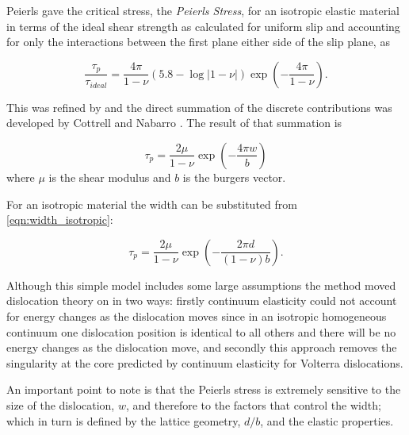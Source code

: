 Peierls gave the critical stress, the \emph{Peierls Stress}, for an isotropic elastic material in terms of the ideal shear strength as calculated for uniform slip and accounting for only the interactions between the first plane either side of the slip plane, as


\begin{equation}
\frac{\tau_p}{\tau_{ideal}} = \frac{4 \pi}{1 - \nu} (5.8 - \log|1-\nu|) \exp\left(-\frac{4\pi}{1 - \nu}\right).
\end{equation}

This was refined by \citet{Nabarro1947} and the direct summation of the discrete contributions was developed by Cottrell and Nabarro \cite{cottrell1953}. The result of that summation is



\begin{equation}
\tau_p = \frac{2\mu}{1-\nu} \exp\left( - \frac{4\pi w}{b} \right)
\end{equation}
where $\mu$ is the shear modulus and $b$ is the burgers vector.

For an isotropic material the width can be substituted from \autoref{eqn:width_isotropic}:

\begin{equation}
\tau_p = \frac{2\mu}{1-\nu} \exp\left( - \frac{2\pi d}{(1-\nu)b} \right).
\end{equation}

Although this simple model includes some large assumptions the method moved dislocation theory on in two ways: firstly continuum elasticity could not account for energy changes as the dislocation moves since in an isotropic homogeneous continuum one dislocation position is identical to all others and there will be no energy changes as the dislocation move, and secondly this approach removes the singularity at the core predicted by continuum elasticity for Volterra dislocations.


An important point to note is that the Peierls stress is extremely sensitive to the size of the dislocation, $w$, and therefore to the factors that control the width; which in turn is defined by the lattice geometry, $d/b$, and the elastic properties.



